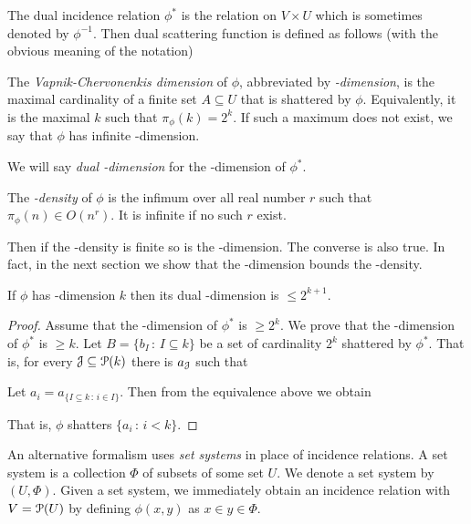 \documentclass[sputnik.tex]{subfiles}
\begin{document}
The dual incidence relation $\phi^*$ is the relation on $V\times U$ which is sometimes denoted by $\phi^{-1}$.
Then dual scattering function is defined as follows (with the obvious meaning of the notation) 


\begin{definition}\label{def_VCdim}
The \emph{Vapnik-Cher\-vo\-nen\-kis dimension\/} of $\phi$, abbreviated by \emph{\vc-dimension}, is the maximal cardinality of a finite set $A\subseteq U$ that is shattered by $\phi$.
Equivalently, it is the maximal $k$ such that $\pi_\phi(k)=2^k$.
If such a maximum does not exist,
we say that $\phi$ has infinite \vc-dimension.

We will say \emph{dual \vc-dimension\/} for the \vc-dimension of $\phi^*$.

The \emph{\vc-density\/} of $\phi$ is the infimum over all real number $r$ such that $\pi_\phi(n)\in O(n^r)$.
It is infinite if no such $r$ exist.\QED
\end{definition}


Then if the \vc-density is finite so is the \vc-dimension.
The converse is also true.
In fact, in the next section we show that the \vc-dimension bounds the \vc-density.

\begin{proposition}
If $\phi$ has \vc-dimension $k$ then its dual \vc-dimension is $\le 2^{k+1}$.
\end{proposition}

\begin{proof}
Assume that the \vc-dimension of $\phi^*$ is $\ge 2^k$.
We prove that the \vc-dimension of $\phi^*$ is $\ge k$.
Let $B=\{b_I\,:\,I\subseteq k\}$ be a set of cardinality $2^k$ shattered by $\phi^*$. 
That is, for every $\J\subseteq \P(k)$ there is $a_\J$ such that


Let $a_i=a_{\{I\subseteq k\,:\, i\in I\}}$. Then from the equivalence above we obtain


That is, $\phi$ shatters $\{a_i\,:\,i<k\}$.
\end{proof}

An alternative formalism uses \emph{set systems\/} in place of incidence relations.
A set system is a collection $\Phi$ of subsets of some set $U$.
We denote a set system by $(U,\Phi)$.
Given a set system, we immediately obtain an incidence relation with $V=\P(U)$ by defining $\phi(x,y)$ as $x\in y\in\Phi$.
\end{document}

